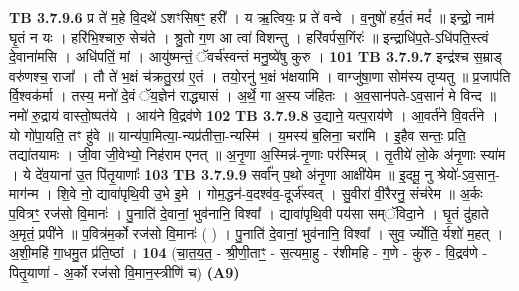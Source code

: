 \documentclass[17pt]{extarticle}
\begin{document}
{{{{{{{{{{{{{{{{{{{                  \newline
                                \textbf{ TB 3.7.9.6} \newline
                  प्र ते॑ म॒हे वि॒दथे॑ ऽशꣳसिषꣳ॒॒ हरी᳚ । य ऋ॒त्वियः॒ प्र ते॑ वन्वे । व॒नुषो॑ हर्य॒तं मदं᳚ ॥ इन्द्रो॒ नाम॑ घृ॒तं न यः । हरि॑भि॒श्चारु॒ सेच॑ते । श्रु॒तो ग॒ण आ त्वा॑ विशन्तु । हरि॑वर्पस॒गिंरः॑ ॥ इन्द्राधि॑प॒ते-ऽधि॑पति॒स्त्वं दे॒वाना॑मसि । अधि॑पतिं॒ मां । आयु॑ष्मन्तं॒ ॅवर्च॑स्वन्तं मनु॒ष्ये॑षु कुरु । \textbf{ 101} \newline
                  \newline
                                \textbf{ TB 3.7.9.7} \newline
                  इन्द्र॑श्च स॒म्राड् वरु॑णश्च॒ राजा᳚ । तौ ते॑ भ॒क्षं च॑क्रतु॒रग्र॑ ए॒तं । तयो॒रनु॑ भ॒क्षं भ॑क्षयामि । वाग्जु॑षा॒णा सोम॑स्य तृप्यतु ॥ प्र॒जाप॑ति र्वि॒श्वक॑र्मा । तस्य॒ मनो॑ दे॒वं ॅय॒ज्ञेन॑ राद्ध्यासं । अ॒र्थे॒ गा अ॒स्य ज॑हितः । अ॒व॒सान॑पते-ऽव॒सानं॑ मे विन्द ॥ नमो॑ रु॒द्राय॑ वास्तो॒ष्पत॑ये । आय॑ने वि॒द्रव॑णे \textbf{ 102} \newline
                  \newline
                                \textbf{ TB 3.7.9.8} \newline
                  उ॒द्याने॒ यत्प॒राय॑णे । आ॒वर्त॑ने वि॒वर्त॑ने । यो गो॑पा॒यति॒ तꣳ हु॑वे ॥ यान्य॑पा॒मित्या॒-न्यप्र॑तीत्ता॒-न्यस्मि॑ । य॒मस्य॑ ब॒लिना॒ चरा॑मि । इ॒हैव सन्तः॒ प्रति॒ तद्या॑तयामः । जी॒वा जी॒वेभ्यो॒ निह॑राम एनत् ॥ अ॒नृ॒णा अ॒स्मिन्न॑-नृ॒णाः पर॑स्मिन्न् । तृ॒तीये॑ लो॒के अ॑नृ॒णाः स्या॑म । ये दे॑व॒याना॑ उ॒त पि॑तृ॒याणाः᳚ \textbf{ 103} \newline
                  \newline
                                \textbf{ TB 3.7.9.9} \newline
                  सर्वा᳚न् प॒थो अ॑नृ॒णा आक्षी॑येम ॥ इ॒दमू॒ नु श्रेयो॑-ऽव॒सान॒-माग॑न्म । शि॒वे नो॒ द्यावा॑पृथि॒वी उ॒भे इ॒मे । गोम॒द्धन॑-व॒दश्व॑व॒-दूर्ज॑स्वत् । सु॒वीरा॑ वी॒रैरनु॒ संच॑रेम ॥ अ॒र्कः प॒वित्रꣳ॒॒ रज॑सो वि॒मानः॑ । पु॒नाति॑ दे॒वानां॒ भुव॑नानि॒ विश्वा᳚ । द्यावा॑पृथि॒वी पय॑सा सम्ॅविदा॒ने । घृ॒तं दु॑हाते अ॒मृतं॒ प्रपी॑ने ॥ प॒वित्र॑म॒र्को रज॑सो वि॒मानः॑ ( ) । पु॒नाति॑ दे॒वानां॒ भुव॑नानि॒ विश्वा᳚ । सुव॒ र्ज्योति॒ र्यशो॑ म॒हत् । अ॒शी॒महि॑ गा॒धमु॒त प्र॑ति॒ष्ठां । \textbf{ 104} \newline
                  \newline
                                    (चा॒त॒य॒त॒ - श्री॒णी॒ताꣳ॒॒ - स॒त्यमा॒हु - र॑शीमहि - ग॒णे - कु॑रु - वि॒द्रव॑णे - पितृ॒याणा॑ - अ॒र्को रज॑सो वि॒मान॒स्त्रीणि॑ च) \textbf{(A9)} \newline \newline
}}}}}}}}}}}}}}}}}}}
\end{document}
